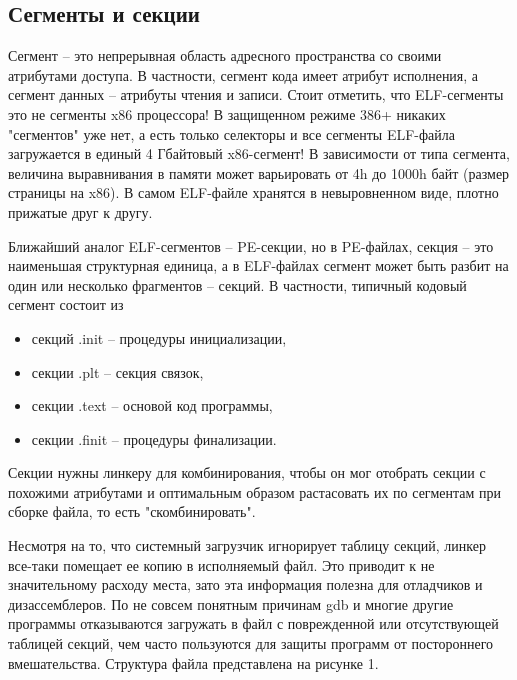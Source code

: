 \subsection{Сегменты и секции}

Сегмент -- это непрерывная область адресного пространства со своими атрибутами доступа. В частности, сегмент кода имеет атрибут исполнения, а сегмент данных -- атрибуты чтения и записи. Стоит отметить, что ELF-сегменты это не сегменты x86 процессора! В защищенном режиме 386+ никаких "сегментов" уже нет, а есть только селекторы и все сегменты ELF-файла загружается в единый 4 Гбайтовый x86-сегмент! В зависимости от типа сегмента, величина выравнивания в памяти может варьировать от 4h до 1000h байт (размер страницы на x86). В самом ELF-файле хранятся в невыровненном виде, плотно прижатые друг к другу.

Ближайший аналог ELF-сегментов -- PE-секции, но в PE-файлах, секция -- это наименьшая структурная единица, а в ELF-файлах сегмент может быть разбит на один или несколько фрагментов -- секций. В частности, типичный кодовый сегмент состоит из
\begin{itemize}
\item секций .init -- процедуры инициализации,
\item секции .plt -- секция связок,
\item секции .text -- основой код программы,
\item секции .finit -- процедуры финализации.
\end{itemize}
Секции нужны линкеру для комбинирования, чтобы он мог отобрать секции с похожими атрибутами и оптимальным образом растасовать их по сегментам при сборке файла, то есть "скомбинировать"\cite{Cit2}.

Несмотря на то, что системный загрузчик игнорирует таблицу секций, линкер все-таки помещает ее копию в исполняемый файл. Это приводит к не значительному расходу места, зато эта информация полезна для отладчиков и дизассемблеров. По не совсем понятным причинам gdb и многие другие программы отказываются загружать в файл с поврежденной или отсутствующей таблицей секций, чем часто пользуются для защиты программ от постороннего вмешательства. Структура файла представлена на рисунке 1.

